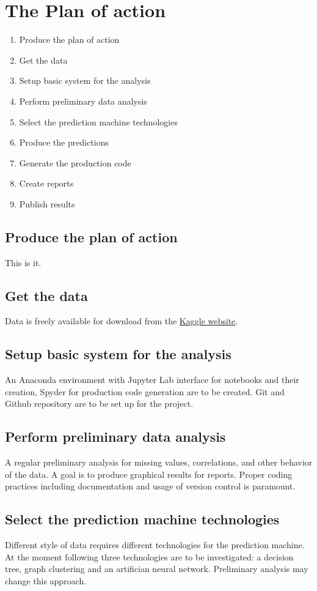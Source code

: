 \documentclass{article}
\begin{document}
\section{The Plan of action}
\begin{enumerate}
	\item Produce the plan of action
	\item Get the data
	\item Setup basic system for the analysis
	\item Perform preliminary data analysis
	\item Select the prediction machine technologies
	\item Produce the predictions
	\item Generate the production code
	\item Create reports
	\item Publish results
\end{enumerate}

\subsection{Produce the plan of action}
This is it.

\subsection{Get the data}
Data is freely available for download from the \href{https://www.kaggle.com/c/titanic/overview}{Kaggle website}.

\subsection{Setup basic system for the analysis}
An Anaconda environment with Jupyter Lab interface for notebooks and their creation, Spyder for production code generation are to be created. Git and Github repository are to be set up for the project.

\subsection{Perform preliminary data analysis}
A regular preliminary analysis for missing values, correlations, and other behavior of the data. A goal is to produce graphical results for reports. Proper coding practices including documentation and usage of version control is paramount.

\subsection{Select the prediction machine technologies}
Different style of data requires different technologies for the prediction machine. At the moment following three technologies are to be investigated: a decision tree, graph clustering and an artifician neural network. Preliminary analysis may change this approach.
\end{document}
